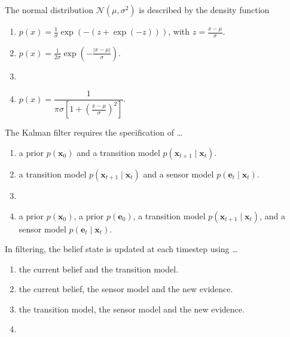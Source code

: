 \documentclass[11pt, a4paper]{exam}
\begin{document}
\begin{quiz}
    \item The normal distribution $\mathcal{N}(\mu, \sigma^2)$ is described by the density function
    \begin{enumerate}[label=$\bigcirc$]
        \item $p(x) = \frac{1}{\sigma} \exp\left(-(z + \exp(-z))\right)$, with $z = \frac{x - \mu}{\sigma}$.
        \item $p(x) = \frac{1}{2\sigma} \exp\left(-\frac{|x - \mu|}{\sigma}\right)$.
        \item {}
        \item $p(x) = \dfrac{1}{\pi \sigma \left[1 + \left(\frac{x - \mu}{\sigma}\right)^2\right]}$.
    \end{enumerate}

    \item The Kalman filter requires the specification of \ldots
    \begin{enumerate}[label=$\bigcirc$]
        \item a prior $p(\mathbf{x}_0)$ and a transition model $p(\mathbf{x}_{t+1} \mid \mathbf{x}_t)$.
        \item a transition model $p(\mathbf{x}_{t+1} \mid \mathbf{x}_t)$ and a sensor model $p(\mathbf{e}_t \mid \mathbf{x}_t)$.
        \item {}
        \item a prior $p(\mathbf{x}_0)$, a prior $p(\mathbf{e}_0)$, a transition model $p(\mathbf{x}_{t+1} \mid \mathbf{x}_t)$, and a sensor model $p(\mathbf{e}_t \mid \mathbf{x}_t)$.
    \end{enumerate}

    \item In filtering, the belief state is updated at each timestep using \ldots
    \begin{enumerate}[label=$\bigcirc$]
        \item the current belief and the transition model.
        \item the current belief, the sensor model and the new evidence.
        \item the transition model, the sensor model and the new evidence.
        \item {}
    \end{enumerate}


\end{quiz}
\end{document}
